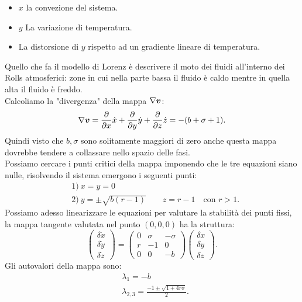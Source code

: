 \begin{exmp}
    \begin{itemize}
        \item $x$ la convezione del sistema.
	\item $y$ La variazione di temperatura.
	\item La distorsione di $y$ rispetto ad un gradiente lineare di temperatura.
    \end{itemize}
    Quello che fa il modello di Lorenz è descrivere il moto dei fluidi all'interno dei Rolls atmosferici: zone in cui nella parte bassa il fluido è caldo mentre in quella alta il fluido è freddo.\\
    Calcoliamo la "divergenza" della mappa $\nabla \boldsymbol{v}$:
    \[
        \nabla \boldsymbol{v}  = \frac{\partial }{\partial x} \dot{x} + \frac{\partial }{\partial y} \dot{y} + \frac{\partial }{\partial z} \dot{z} = 
	- (b + \sigma  + 1)
    .\] 
    Quindi visto che $b, \sigma$ sono solitamente maggiori di zero anche questa mappa dovrebbe tendere a collassare nello spazio delle fasi.\\
    Possiamo cercare i punti critici della mappa imponendo che le tre equazioni siano nulle, risolvendo il sistema emergono i seguenti punti:
    \[\begin{aligned}
	& 1)  \ x = y = 0 \\
	& 2) \ y = \pm \sqrt{b (r-1)} \qquad z = r-1 \quad \text{con }r>1
    .\end{aligned}\]
    Possiamo adesso linearizzare le equazioni per valutare la stabilità dei punti fissi, la mappa tangente valutata nel punto $(0, 0, 0)$ ha la struttura:
    \[
        \begin{pmatrix} \delta\dot{x} \\ \delta\dot{y} \\ \delta\dot{z} \end{pmatrix} =
	\begin{pmatrix} 
	    0 & \sigma & -\sigma \\
	    r & -1 & 0\\
	    0 & 0 & -b
	\end{pmatrix} 
	\begin{pmatrix} \delta x\\\delta y\\\delta z \end{pmatrix} 
    .\] 
    Gli autovalori della mappa sono:
    \[\begin{aligned}
	&\lambda_1 = -b\\
	&\lambda_{2, 3} = \frac{-1 \pm \sqrt{1 + 4r\sigma} }{2}
    .\end{aligned}\]

\end{exmp}
